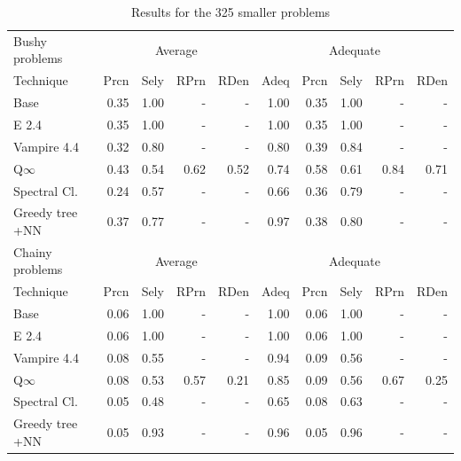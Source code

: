 \documentclass[EPiC]{easychair}
\begin{document}
\begin{table}[hbt]
\begin{center}
\begin{tabular}{|l|rrrr|r|rrrr|}
\hline
Bushy problems  & \multicolumn{4}{|c|}{Average} & \multicolumn{5}{|c|}{Adequate} \\
Technique       & Prcn & Sely & RPrn & RDen & Adeq & Prcn & Sely & RPrn & RDen \\
\hline
Base            & 0.35 & 1.00 &  -   &  -   & 1.00 & 0.35 & 1.00 &  -   &  -   \\
E 2.4           & 0.35 & 1.00 &  -   &  -   & 1.00 & 0.35 & 1.00 &  -   &  -   \\
Vampire 4.4     & 0.32 & 0.80 &  -   &  -   & 0.80 & 0.39 & 0.84 &  -   &  -   \\
Q$\infty$       & 0.43 & 0.54 & 0.62 & 0.52 & 0.74 & 0.58 & 0.61 & 0.84 & 0.71 \\
Spectral Cl.    & 0.24 & 0.57 &  -   &  -   & 0.66 & 0.36 & 0.79 &  -   &  -   \\
Greedy tree +NN & 0.37 & 0.77 &  -   &  -   & 0.97 & 0.38 & 0.80 &  -   &  -   \\
\hline
Chainy problems & \multicolumn{4}{|c|}{Average} & \multicolumn{5}{|c|}{Adequate} \\
Technique       & Prcn & Sely & RPrn & RDen & Adeq & Prcn & Sely & RPrn & RDen \\
\hline
Base            & 0.06 & 1.00 &  -   &  -   & 1.00 & 0.06 & 1.00 &  -   &  -   \\
E 2.4           & 0.06 & 1.00 &  -   &  -   & 1.00 & 0.06 & 1.00 &  -   &  -   \\
Vampire 4.4     & 0.08 & 0.55 &  -   &  -   & 0.94 & 0.09 & 0.56 &  -   &  -   \\
Q$\infty$       & 0.08 & 0.53 & 0.57 & 0.21 & 0.85 & 0.09 & 0.56 & 0.67 & 0.25 \\
Spectral Cl.    & 0.05 & 0.48 &  -   &  -   & 0.65 & 0.08 & 0.63 &  -   &  -   \\
Greedy tree +NN & 0.05 & 0.93 &  -   &  -   & 0.96 & 0.05 & 0.96 &  -   &  -   \\
\hline
\end{tabular}
\caption{Results for the 325 smaller problems}
\label{Results325}
\end{center}
\end{table}
\end{document}
